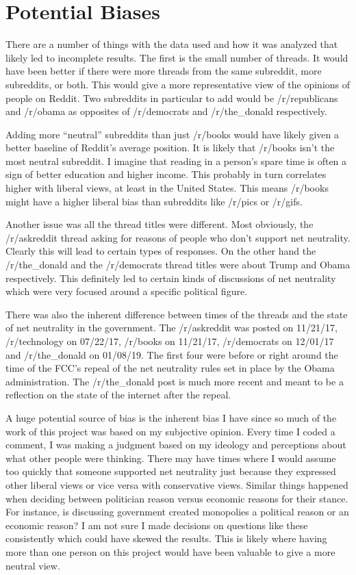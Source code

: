 \documentclass[11pt]{article}
\begin{document}
	\section{Potential Biases}\label{sec:biases}
	There are a number of things with the data used and how it was analyzed that likely led to incomplete results. The first is the small number of threads. It would have been better if there were more threads from the same subreddit, more subreddits, or both. This would give a more representative view of the opinions of people on Reddit. Two subreddits in particular to add would be /r/republicans and /r/obama as opposites of /r/democrats and /r/the\_donald respectively. 
	
	Adding more ``neutral'' subreddits than just /r/books would have likely given a better baseline of Reddit's average position. It is likely that /r/books isn't the most neutral subreddit. I imagine that reading in a person's spare time is often a sign of better education and higher income. This probably in turn correlates higher with liberal views, at least in the United States. This means /r/books might have a higher liberal bias than subreddits like /r/pics or /r/gifs. 
	
	Another issue was all the thread titles were different. Most obviously, the /r/askreddit thread asking for reasons of people who don't support net neutrality. Clearly this will lead to certain types of responses. On the other hand the /r/the\_donald and the /r/democrats thread titles were about Trump and Obama respectively. This definitely led to certain kinds of discussions of net neutrality which were very focused around a specific political figure. 

	There was also the inherent difference between times of the threads and the state of net neutrality in the government. The /r/askreddit was posted on 11/21/17, /r/technology on 07/22/17, /r/books on 11/21/17, /r/democrats on 12/01/17 and /r/the\_donald on 01/08/19. The first four were before or right around the time of the FCC's repeal of the net neutrality rules set in place by the Obama administration. The /r/the\_donald post is much more recent and meant to be a reflection on the state of the internet after the repeal. 
	
	A huge potential source of bias is the inherent bias I have since so much of the work of this project was based on my subjective opinion. Every time I coded a comment, I was making a judgment based on my ideology and perceptions about what other people were thinking. There may have times where I would assume too quickly that someone supported net neutrality just because they expressed other liberal views or vice versa with conservative views. Similar things happened when deciding between politician reason versus economic reasons for their stance. For instance, is discussing government created monopolies a political reason or an economic reason? I am not sure I made decisions on questions like these consistently which could have skewed the results. This is likely where having more than one person on this project would have been valuable to give a more neutral view. 
	
\end{document}
